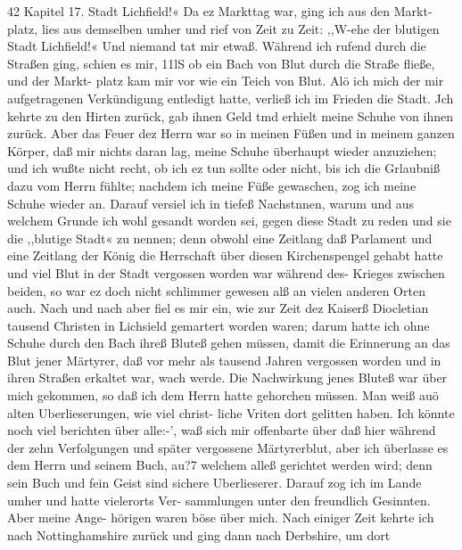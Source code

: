 42 Kapitel 17.
Stadt Lichfield!« Da ez Markttag war, ging ich aus den Markt-
platz, lies aus demselben umher und rief von Zeit zu Zeit: ,,W-ehe
der blutigen Stadt Lichfield!« Und niemand tat mir etwaß.
Während ich rufend durch die Straßen ging, schien es mir, 11lS
ob ein Bach von Blut durch die Straße fließe, und der Markt-
platz kam mir vor wie ein Teich von Blut. Alö ich mich der
mir aufgetragenen Verkündigung entledigt hatte, verließ ich im
Frieden die Stadt. Jch kehrte zu den Hirten zurück, gab ihnen
Geld tmd erhielt meine Schuhe von ihnen zurück. Aber das
Feuer dez Herrn war so in meinen Füßen und in meinem ganzen
Körper, daß mir nichts daran lag, meine Schuhe überhaupt wieder
anzuziehen; und ich wußte nicht recht, ob ich ez tun sollte oder
nicht, bis ich die Grlaubniß dazu vom Herrn fühlte; nachdem ich
meine Füße gewaschen, zog ich meine Schuhe wieder an. Darauf
versiel ich in tiefeß Nachstnnen, warum und aus welchem Grunde
ich wohl gesandt worden sei, gegen diese Stadt zu reden und sie
die ,,blutige Stadt« zu nennen; denn obwohl eine Zeitlang daß
Parlament und eine Zeitlang der König die Herrschaft über diesen
Kirchenspengel gehabt hatte und viel Blut in der Stadt vergossen
worden war während des- Krieges zwischen beiden, so war ez
doch nicht schlimmer gewesen alß an vielen anderen Orten auch.
Nach und nach aber fiel es mir ein, wie zur Zeit dez Kaiserß
Diocletian tausend Christen in Lichsield gemartert worden waren;
darum hatte ich ohne Schuhe durch den Bach ihreß Bluteß gehen
müssen, damit die Erinnerung an das Blut jener Märtyrer, daß
vor mehr als tausend Jahren vergossen worden und in ihren
Straßen erkaltet war, wach werde. Die Nachwirkung jenes Bluteß
war über mich gekommen, so daß ich dem Herrn hatte gehorchen
müssen. Man weiß auö alten Uberlieserungen, wie viel christ-
liche Vriten dort gelitten haben. Ich könnte noch viel berichten
über alle:-’, waß sich mir offenbarte über daß hier während der
zehn Verfolgungen und später vergossene Märtyrerblut, aber ich
überlasse es dem Herrn und seinem Buch, au?7 welchem alleß
gerichtet werden wird; denn sein Buch und fein Geist sind sichere
Uberlieserer.
Darauf zog ich im Lande umher und hatte vielerorts Ver-
sammlungen unter den freundlich Gesinnten. Aber meine Ange-
hörigen waren böse über mich. Nach einiger Zeit kehrte ich nach
Nottinghamshire zurück und ging dann nach Derbshire, um dort


